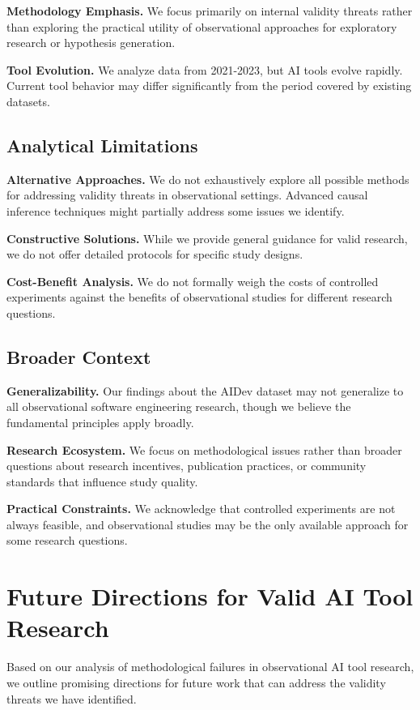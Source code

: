 \documentclass[conference]{IEEEtran}
\begin{document}
\textbf{Methodology Emphasis.} We focus primarily on internal validity threats rather than exploring the practical utility of observational approaches for exploratory research or hypothesis generation.

\textbf{Tool Evolution.} We analyze data from 2021-2023, but AI tools evolve rapidly. Current tool behavior may differ significantly from the period covered by existing datasets.

\subsection{Analytical Limitations}

\textbf{Alternative Approaches.} We do not exhaustively explore all possible methods for addressing validity threats in observational settings. Advanced causal inference techniques might partially address some issues we identify.

\textbf{Constructive Solutions.} While we provide general guidance for valid research, we do not offer detailed protocols for specific study designs.

\textbf{Cost-Benefit Analysis.} We do not formally weigh the costs of controlled experiments against the benefits of observational studies for different research questions.

\subsection{Broader Context}

\textbf{Generalizability.} Our findings about the AIDev dataset may not generalize to all observational software engineering research, though we believe the fundamental principles apply broadly.

\textbf{Research Ecosystem.} We focus on methodological issues rather than broader questions about research incentives, publication practices, or community standards that influence study quality.

\textbf{Practical Constraints.} We acknowledge that controlled experiments are not always feasible, and observational studies may be the only available approach for some research questions.

\section{Future Directions for Valid AI Tool Research}

Based on our analysis of methodological failures in observational AI tool research, we outline promising directions for future work that can address the validity threats we have identified.
\end{document}
